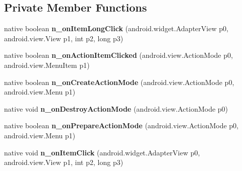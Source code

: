 \subsection*{Private Member Functions}
\begin{DoxyCompactItemize}
\item 
\mbox{\label{classmd5b60ffeb829f638581ab2bb9b1a7f4f3f_1_1CellAdapter_a5301628c9f5025605e0c12a308a87705}} 
native boolean {\bfseries n\+\_\+on\+Item\+Long\+Click} (android.\+widget.\+Adapter\+View p0, android.\+view.\+View p1, int p2, long p3)
\item 
\mbox{\label{classmd5b60ffeb829f638581ab2bb9b1a7f4f3f_1_1CellAdapter_ac87b7ef02f8bf331b2f74e970f872e74}} 
native boolean {\bfseries n\+\_\+on\+Action\+Item\+Clicked} (android.\+view.\+Action\+Mode p0, android.\+view.\+Menu\+Item p1)
\item 
\mbox{\label{classmd5b60ffeb829f638581ab2bb9b1a7f4f3f_1_1CellAdapter_afa3d0eff290c0ee14f10b4dc20799c00}} 
native boolean {\bfseries n\+\_\+on\+Create\+Action\+Mode} (android.\+view.\+Action\+Mode p0, android.\+view.\+Menu p1)
\item 
\mbox{\label{classmd5b60ffeb829f638581ab2bb9b1a7f4f3f_1_1CellAdapter_a3dab8c32f57edad8c9c66d9944a5fcc2}} 
native void {\bfseries n\+\_\+on\+Destroy\+Action\+Mode} (android.\+view.\+Action\+Mode p0)
\item 
\mbox{\label{classmd5b60ffeb829f638581ab2bb9b1a7f4f3f_1_1CellAdapter_a2b208b6906f76ea8618d4a8fdfd42930}} 
native boolean {\bfseries n\+\_\+on\+Prepare\+Action\+Mode} (android.\+view.\+Action\+Mode p0, android.\+view.\+Menu p1)
\item 
\mbox{\label{classmd5b60ffeb829f638581ab2bb9b1a7f4f3f_1_1CellAdapter_ab7cc9e422e966560e28f28619fdbdb58}} 
native void {\bfseries n\+\_\+on\+Item\+Click} (android.\+widget.\+Adapter\+View p0, android.\+view.\+View p1, int p2, long p3)
\item 
\mbox{\label{classmd5b60ffeb829f638581ab2bb9b1a7f4f3f_1_1CellAdapter_a671a301aea8b82bb20f32bfd1147767f}} 

\end{DoxyCompactItemize}
